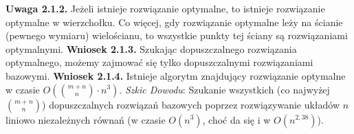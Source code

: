 \documentclass[licencjacka]{pracamgr}
\begin{document}
\textbf{Uwaga 2.1.2.} Jeżeli istnieje rozwiązanie optymalne, to istnieje rozwiązanie optymalne w wierzchołku.
Co więcej, gdy rozwiązanie optymalne leży na ścianie (pewnego wymiaru) wielościanu, to wszystkie punkty tej ściany są rozwiązaniami optymalnymi.\newline\newline
\textbf{Wniosek 2.1.3.} Szukając dopuszczalnego rozwiązania optymalnego, możemy zajmować się tylko dopuszczalnymi rozwiązaniami bazowymi.\newline\newline
%
\textbf{Wniosek 2.1.4.} Istnieje algorytm znajdujący rozwiązanie optymalne w czasie $O({m+n\choose n}\cdot n^3)$.\newline\newline
\textit{Szkic Dowodu}: 
Szukanie wszystkich (co najwyżej ${m+n \choose n}$) dopuszczalnych rozwiązań bazowych poprzez rozwiązywanie układów $n$ liniowo niezależnych równań (w czasie $O(n^3)$, choć da się i w $O(n^{2,38})$).\newline
\end{document}
